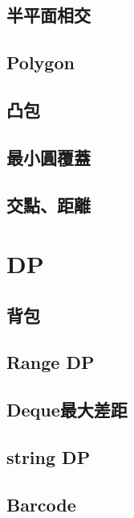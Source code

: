     \subsection{半平面相交}
        
    \subsection{Polygon}
         \columnbreak
        \subsection{凸包}
        
        \subsection{最小圓覆蓋}
        
        \subsection{交點、距離}
            
\clearpage

\section{DP}
    \subsection{背包}
         \columnbreak
    \subsection{Range DP}
        
    \subsection{Deque最大差距}
         \columnbreak
    \subsection{string DP}
        
    \subsection{Barcode}
        
